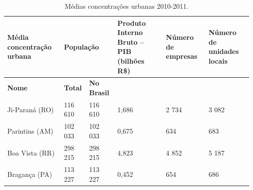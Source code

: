 \begin{table}[htb]
	\ABNTEXfontereduzida
	\caption{\label{tab:Tab_1}Médias concentrações urbanas 2010-2011.}
	\begin{tabular}{@{}p{3.0cm}p{1.5cm}p{2cm}p{2.5cm}p{2.5cm}p{2.5cm}@{}}
		\toprule
		\textbf{Média concentração urbana} & \multicolumn{2}{l}{\textbf{População}} & \textbf{Produto Interno Bruto – PIB (bilhões R\$)} & \textbf{Número de empresas} & \textbf{Número de unidades locais} \\ \midrule
		\textbf{Nome}                      & \textbf{Total}   & \textbf{No Brasil}  &                                                   &                             & \\
		Ji-Paraná (RO)                     & 116 610          & 116 610             & 1,686                                             & 2 734                       & 3 082 \\
		Parintins (AM)                     & 102 033          & 102 033             & 0,675                                             & 634                         & 683 \\
		Boa Vista (RR)                     & 298 215          & 298 215             & 4,823                                             & 4 852                       & 5 187 \\
		Bragança (PA)                      & 113 227          & 113 227             & 0,452                                             & 654                         & 686 \\ \bottomrule
	\end{tabular}
\end{table}